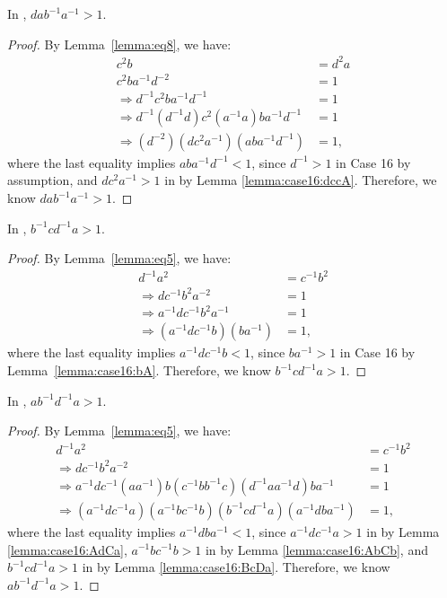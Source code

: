 \begin{lemma} In , $dab^{-1}a^{-1}>1$.
\label{lemma:case16:daBA}
\end{lemma}
\begin{proof} By Lemma~\ref{lemma:eq8}, we have:
\begin{align*}
c^{2}b&=d^{2}a\\
c^{2}ba^{-1}d^{-2}&=1\\
\Rightarrow{}d^{-1}c^{2}ba^{-1}d^{-1}&=1\\
\Rightarrow{}d^{-1}(d^{-1}d)c^{2}(a^{-1}a)ba^{-1}d^{-1}&=1\\
\Rightarrow{}(d^{-2})(dc^{2}a^{-1})(aba^{-1}d^{-1})&=1,
\end{align*}
where the last equality implies $aba^{-1}d^{-1}<1$, since $d^{-1}>1$ in Case 16 by assumption, and $dc^{2}a^{-1}>1$ in  by Lemma \ref{lemma:case16:dccA}. Therefore, we know $dab^{-1}a^{-1}>1$.
\end{proof}

\begin{lemma} In , $b^{-1}cd^{-1}a>1$.
\label{lemma:case16:BcDa}
\end{lemma}
\begin{proof} By Lemma~\ref{lemma:eq5}, we have:
\begin{align*}
d^{-1}a^{2}&=c^{-1}b^{2}\\
\Rightarrow{}dc^{-1}b^{2}a^{-2}&=1\\
\Rightarrow{}a^{-1}dc^{-1}b^{2}a^{-1}&=1\\
\Rightarrow{}(a^{-1}dc^{-1}b)(ba^{-1})&=1,
\end{align*}
where the last equality implies $a^{-1}dc^{-1}b<1$, since $ba^{-1}>1$ in Case 16 by Lemma~\ref{lemma:case16:bA}. Therefore, we know $b^{-1}cd^{-1}a>1$.
\end{proof}

\begin{lemma} In , $ab^{-1}d^{-1}a>1$.
\label{lemma:case16:aBDa}
\end{lemma}
\begin{proof} By Lemma~\ref{lemma:eq5}, we have:
\begin{align*}
d^{-1}a^{2}&=c^{-1}b^{2}\\
\Rightarrow{}dc^{-1}b^{2}a^{-2}&=1\\
\Rightarrow{}a^{-1}dc^{-1}(aa^{-1})b(c^{-1}bb^{-1}c)(d^{-1}aa^{-1}d)ba^{-1}&=1\\
\Rightarrow{}(a^{-1}dc^{-1}a)(a^{-1}bc^{-1}b)(b^{-1}cd^{-1}a)(a^{-1}dba^{-1})&=1,
\end{align*}
where the last equality implies $a^{-1}dba^{-1}<1$, since $a^{-1}dc^{-1}a>1$ in  by Lemma \ref{lemma:case16:AdCa}, $a^{-1}bc^{-1}b>1$ in  by Lemma \ref{lemma:case16:AbCb}, and $b^{-1}cd^{-1}a>1$ in  by Lemma \ref{lemma:case16:BcDa}. Therefore, we know $ab^{-1}d^{-1}a>1$.
\end{proof}

